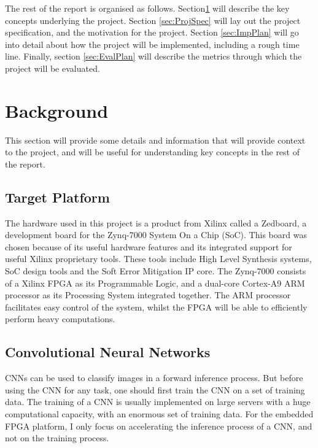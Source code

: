 \documentclass[12pt]{article}
\begin{document}
The rest of the report is organised as follows. Section\ref{sec:Background} will describe the key concepts underlying the project. Section \ref{sec:ProjSpec} will lay out the project specification, and the motivation for the project. Section \ref{sec:ImpPlan} will go into detail about how the project will be implemented, including a rough time line. Finally, section \ref{sec:EvalPlan} will describe the metrics through which the project will be evaluated.

\section{Background}
\label{sec:Background}
\vspace{-12pt}

This section will provide some details and information that will provide context to the project, and will be useful for understanding key concepts in the rest of the report.

\subsection{Target Platform}
\label{sec:Background-TargetPlatform}
\vspace{-12pt}

The hardware used in this project is a product from Xilinx called a Zedboard, a development board for the Zynq-7000 System On a Chip (SoC). This board was chosen because of its useful hardware features and its integrated support for useful Xilinx proprietary tools. These tools include High Level Synthesis systems, SoC design tools and the Soft Error Mitigation IP core. The Zynq-7000 consists of a Xilinx FPGA as its Programmable Logic, and a dual-core Cortex-A9 ARM processor as its Processing System integrated together. The ARM processor facilitates easy control of the system, whilst the FPGA will be able to efficiently perform heavy computations.

\subsection{Convolutional Neural Networks}
\label{sec:Background-CNN}
\vspace{-12pt}

CNNs can be used to classify images in a forward inference process. But before using the CNN for any task, one should first train the CNN on a set of training data. The training of a CNN is usually implemented on large servers with a huge computational capacity, with an enormous set of training data. For the embedded FPGA platform, I only focus on accelerating the inference process of a CNN, and not on the training process.
\end{document}
